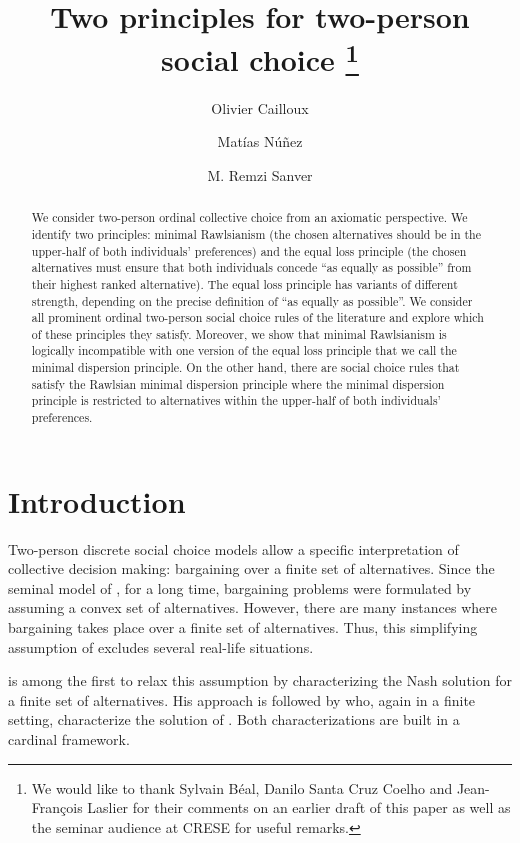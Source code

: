 \documentclass[version=3.21, pagesize, twoside=off, bibliography=totoc, DIV=calc, fontsize=12pt, a4paper]{scrartcl}
\title{Two principles for two-person social choice \thanks{We would like to thank Sylvain Béal, Danilo Santa Cruz Coelho and Jean-François Laslier for their comments on an earlier draft of this paper as well as the seminar audience at CRESE for useful remarks.}}
\author[*]{Olivier Cailloux}
\author[**]{Matías Núñez}
\author[*]{M. Remzi  Sanver}
\affil[*]{Université Paris-Dauphine, PSL Research University, CNRS, LAMSADE, 75016 PARIS, FRANCE}
\affil[**]{CREST, CNRS, École Polytechnique, GENES, ENSAE Paris, Institut Polytechnique de Paris, 91120 Palaiseau, France.}
\begin{document}
\maketitle

\begin{abstract}
    We consider two-person ordinal collective choice from an axiomatic perspective. We identify two principles: minimal Rawlsianism (the chosen alternatives should be in the upper-half of both individuals’ preferences) and the equal loss principle (the chosen alternatives must ensure that both individuals concede “as equally as possible” from their highest ranked alternative). The equal loss principle has variants of different strength, depending on the precise definition of “as equally as possible”. We consider all prominent ordinal two-person social choice rules of the literature and explore which of these principles they satisfy. Moreover, we show that minimal Rawlsianism is logically incompatible with one version of the equal loss principle that we call the minimal dispersion principle. On the other hand, there are social choice rules that satisfy the Rawlsian minimal dispersion principle where the minimal dispersion principle is restricted to alternatives within the upper-half of both individuals’ preferences.
\end{abstract}

\section{Introduction}
\label{sec:intro}
Two-person discrete social choice models allow a specific interpretation of collective decision making: bargaining over a finite set of alternatives. Since the seminal model of \citet{Nash1950}, for a long time, bargaining problems were formulated by assuming a convex set of alternatives. However, there are many instances where bargaining takes place over a finite set of alternatives. Thus, this simplifying assumption of \citeauthor{Nash1950} excludes several real-life situations. 

 is among the first to relax this assumption by characterizing the Nash solution for a finite set of alternatives. His approach is followed by \citet{nagahisa2002axiomatization} who, again in a finite setting, characterize the solution of \citet{kalai1975other}. Both characterizations are built in a cardinal framework. 
 
\end{document}
